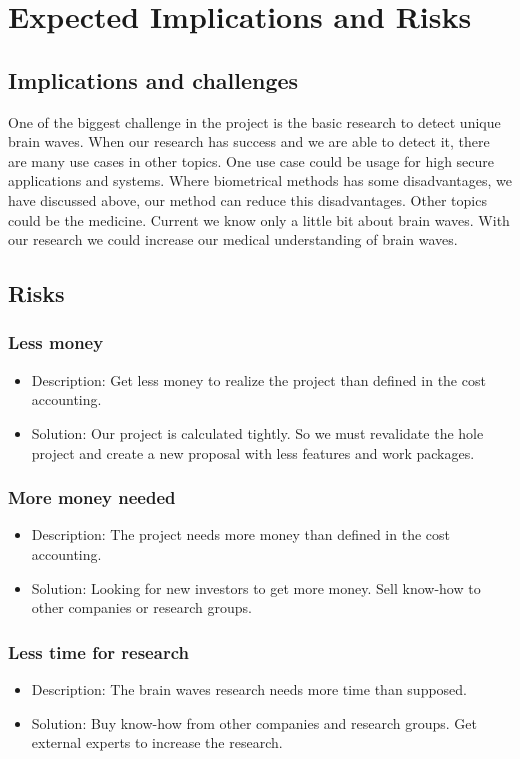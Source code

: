 \section{Expected Implications and Risks}
\label{sect:implication-risk}

\subsection*{Implications and challenges}
One of the biggest challenge in the project is the basic research to detect unique brain waves. When our research has success and we are able to detect it, there are many use cases in other topics. One use case could be usage for high secure applications and systems. Where biometrical methods has some disadvantages, we have discussed above, our method can reduce this disadvantages.
Other topics could be the medicine. Current we know only a little bit about brain waves. With our research we could increase our medical understanding of brain waves.

\subsection*{Risks}

\subsubsection*{Less money}
\begin{itemize}
 \item Description: Get less money to realize the project than defined in the cost accounting.
 \item Solution: Our project is calculated tightly. So we must revalidate the hole project and create a new proposal with less features and work packages.
\end{itemize}

\subsubsection*{More money needed}
\begin{itemize}
 \item Description: The project needs more money than defined in the cost accounting.
 \item Solution: Looking for new investors to get more money. Sell know-how to other companies or research groups.
\end{itemize}

\subsubsection*{Less time for research}
\begin{itemize}
 \item Description: The brain waves research needs more time than supposed.
 \item Solution: Buy know-how from other companies and research groups. Get external experts to increase the research.
\end{itemize}

